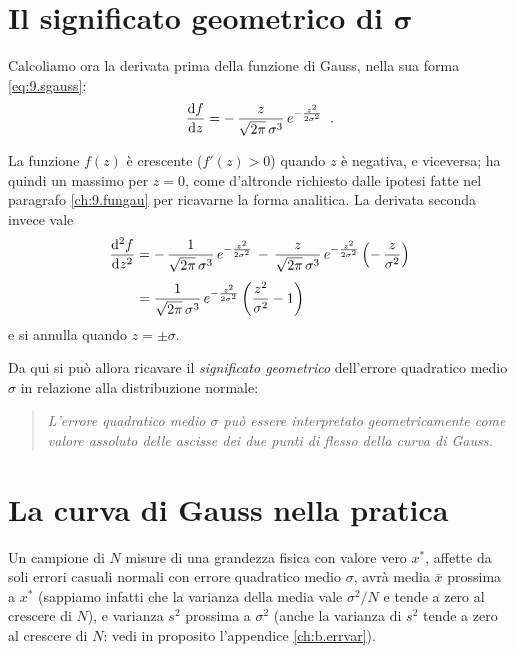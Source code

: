 \section[Il significato geometrico di $\sigma$]%
{Il significato geometrico di $\boldsymbol{\sigma}$}
Calcoliamo ora la derivata prima della funzione di
Gauss, nella sua forma \eqref{eq:9.sgauss}:
\begin{equation*}
  \frac{\mathrm{d} f}{\mathrm{d} z} = - \, \frac{z}{\sqrt{2 \pi}
    \, \sigma^3} \, e^{- \frac{z^2}{2 \sigma^2} } \;\; .
\end{equation*}

La funzione $f(z)$ \`e crescente ($f'(z)>0$) quando $z$ \`e
negativa, e viceversa; ha quindi un massimo per $z=0$, come
d'altronde richiesto dalle ipotesi fatte nel paragrafo
\ref{ch:9.fungau} per ricavarne la forma analitica.  La
derivata seconda invece vale
\begin{align*}
  \frac{\mathrm{d}^2f}{\mathrm{d} z^2} &= - \, \frac{1}{
    \sqrt{2 \pi} \, \sigma^3} \, e^{
    - \frac{z^2}{2 \sigma^2} }
    \, - \, \frac{z}{\sqrt{2 \pi} \, \sigma^3}
    \, e^{- \frac{z^2}{2 \sigma^2} } \left( - \,
    \frac{z}{\sigma^2} \right) \\[0.7ex]
  &= \frac{1}{\sqrt{2 \pi} \, \sigma^3} \,
    e^{-\frac{z^2}{2 \sigma^2} }
    \left( \frac{z^2}{\sigma^2} -1 \right)
\end{align*}
e si annulla quando $z = \pm \sigma$.

Da qui si pu\`o allora ricavare il \emph{significato
  geometrico} dell'errore quadratico medio $\sigma$ in
relazione alla distribuzione normale:
\begin{quote}
  \textit{L'errore quadratico medio $\sigma$ pu\`o essere
    interpretato geometricamente come valore assoluto delle
    ascisse dei due punti di flesso della curva di Gauss.}
\end{quote}%
%

\section{La curva di Gauss nella pratica}
Un campione di $N$ misure di una grandezza fisica con valore
vero $x^*$, affette da soli errori casuali normali con
errore quadratico medio $\sigma$, avr\`a media $\bar x$
prossima a $x^*$ (sappiamo infatti che la varianza della
media vale $ \sigma^2 / N $ e tende a zero al crescere di
$N$), e varianza $s^2$ prossima a $\sigma^2$ (anche la
varianza di $s^2$ tende a zero al crescere di $N$: vedi in
proposito l'appendice \ref{ch:b.errvar}).


